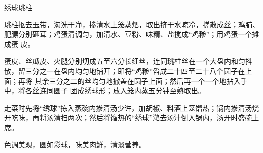 %
%
%
%
%
%
%
\begin{recipe}{绣球珧柱}

\ingredients


\preparation

\step 珧柱抠去玉带，淘洗干净，掺清水上笼蒸𤆵，取出挤干水晾冷，搓散成丝；鸡脯、
肥膘分别砸茸；鸡蛋清调匀，加清水、豆粉、味精、盐搅成“鸡糁”；用鸡蛋一个摊成蛋
皮。

\step 蛋皮、丝瓜皮、火腿分别切成五至六分长细丝，连同珧柱丝在一个大盘内和匀抖
散，留三分之一在盘内均匀地铺开；即将“鸡糁”舀成二十四至二十八个圆子在上面；再将
其余三分之二的丝均匀地撒盖在圆子上面；然后再一个一个地拈入手中，将各丝连同圆子
团成绣球形；放入笼内蒸五分钟至熟取出。

\step 走菜时先将“绣球”拣入蒸碗内掺清汤少许，加胡椒、料酒上笼馏热；锅内掺清汤烧
开吃味，再将汤清扫两次；然后将馏热的“绣球”滗去汤汁倒入锅内，汤开时盛碗上席。

\features

色调美观，圆如彩球，味美肉鲜，清淡营养。

\end{recipe}


